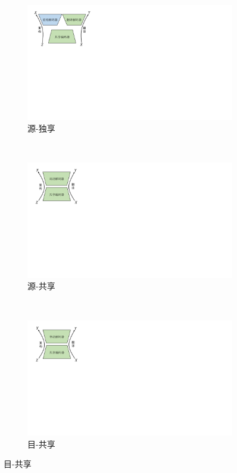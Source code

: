 
\begin{figure}[!htbp]
    \centering
    \begin{subfigure}[b]{0.45\textwidth}
      \includegraphics[scale=0.7]{Img/fig_3_sr.pdf}
      \caption{源-独享}
      \label{fig:3_sr}
    \end{subfigure}%
    ~%
    \begin{subfigure}[b]{0.3\textwidth}
      \includegraphics[scale=0.7]{Img/fig_3_ss.pdf}
      \caption{源-共享}
      \label{fig:3_ss}
    \end{subfigure}
    \\%
    \begin{subfigure}[b]{0.3\textwidth}
      \includegraphics[scale=0.7]{Img/fig_3_t.pdf}
      \caption{目-共享}
      \label{fig:3_t}
    \end{subfigure}%
    \label{fig:4_fidelity}
\end{figure}